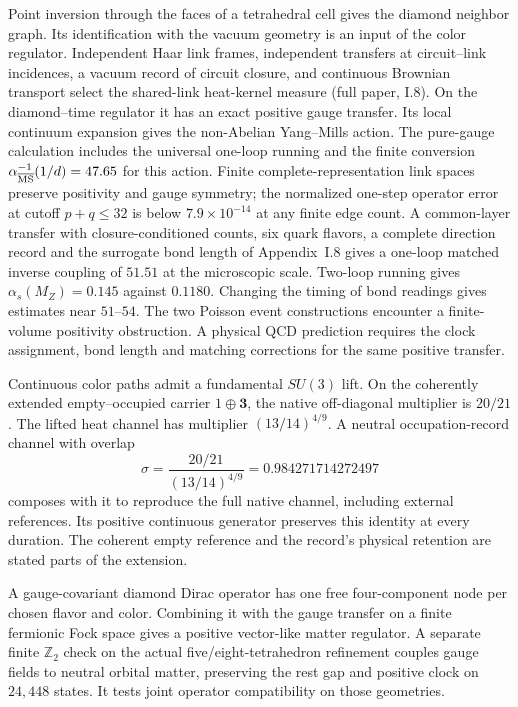 \documentclass[11pt]{article}
\begin{document}
Point inversion through the faces of a tetrahedral cell gives the diamond
neighbor graph. Its identification with the vacuum geometry is an input
of the color regulator. Independent Haar link frames, independent
transfers at circuit--link incidences, a vacuum record of circuit
closure, and continuous Brownian transport select the shared-link
heat-kernel measure (full paper, I.8). On the diamond--time regulator it has
an exact positive gauge transfer. Its local continuum expansion gives
the non-Abelian Yang--Mills action. The pure-gauge calculation includes
the universal one-loop running and the finite conversion
$\alpha_{\overline{\rm MS}}^{-1}(1/d)=47.65$ for this action.
Finite complete-representation link spaces preserve positivity and
gauge symmetry; the normalized one-step operator error at cutoff
$p+q\le32$ is below $7.9\times10^{-14}$ at any finite edge count.
A common-layer transfer with closure-conditioned counts, six quark flavors,
a complete direction record and the surrogate bond length of Appendix~I.8
gives a one-loop matched inverse coupling of $51.51$ at the microscopic
scale. Two-loop running gives $\alpha_s(M_Z)=0.145$ against $0.1180$.
Changing the timing of bond readings gives estimates near $51$--$54$.
The two Poisson event constructions encounter a finite-volume positivity
obstruction. A physical QCD prediction requires the clock assignment,
bond length and matching corrections for the same positive transfer.

Continuous color paths admit a fundamental $SU(3)$ lift. On the
coherently extended empty--occupied carrier $1\oplus\mathbf3$, the
native off-diagonal multiplier is $20/21$. The lifted heat channel
has multiplier $(13/14)^{4/9}$. A neutral occupation-record channel
with overlap
\[
\sigma=\frac{20/21}{(13/14)^{4/9}}=0.984271714272497
\]
composes with it to reproduce the full native channel, including
external references. Its positive continuous generator preserves this
identity at every duration. The coherent empty reference and the
record's physical retention are stated parts of the extension.

A gauge-covariant diamond Dirac operator has one free four-component
node per chosen flavor and color. Combining it with the gauge transfer
on a finite fermionic Fock space gives a positive vector-like matter
regulator. A separate finite $\mathbb Z_2$ check on the actual
five/eight-tetrahedron refinement couples gauge fields to neutral
orbital matter, preserving the rest gap and positive clock on
$24{,}448$ states. It tests joint operator compatibility on those
geometries.
\end{document}
